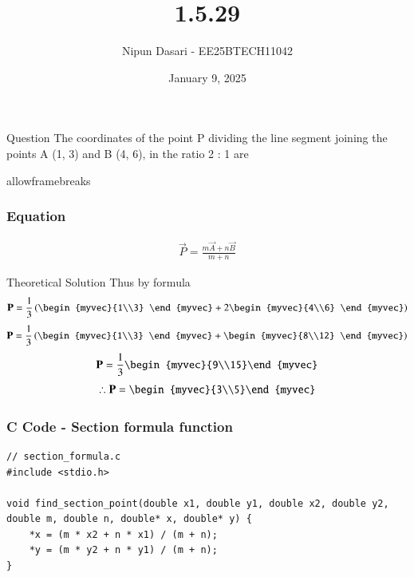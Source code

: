 \documentclass{beamer}
\title %
{1.5.29}
\date{January 9, 2025}
\author %
{Nipun Dasari - EE25BTECH11042}
\begin{document}
	
	
	\frame{\titlepage}
	\begin{frame}{Question}
		The coordinates of the point P dividing the line segment joining the points A (1, 3)
		and B (4, 6), in the ratio 2 : 1 are
	\end{frame}
	\begin{frame}{allowframebreaks}
		\frametitle{Equation}
		
		\centering
		
		\label{tab:parameters}
		\begin{align}
			\vec{P} = \frac{m\vec{A}+n\vec{B}}{m+n}
		\end{align}
		
	\end{frame}
	
	
	\begin{frame}{Theoretical Solution}
		Thus by formula
	\begin{align}
		\vec{P} = \frac{1}{3}\brak{\begin{myvec}{1\\3} \end{myvec}+2\begin{myvec}{4\\6} \end{myvec}}
	\end{align}
	\begin{align}
		\vec{P} = \frac{1}{3}\brak{\begin{myvec}{1\\3} \end{myvec}+\begin{myvec}{8\\12} \end{myvec}}
	\end{align}
	\begin{align}
		\vec{P} = \frac{1}{3}\begin{myvec}{9\\15}\end{myvec}
	\end{align}
	\begin{align}
		\therefore	\vec{P} = \begin{myvec}{3\\5}\end{myvec}
	\end{align}
	\end{frame}
	
	\begin{frame}[fragile]
		\frametitle{C Code - Section formula function }
		
		\begin{lstlisting}
// section_formula.c
#include <stdio.h>

void find_section_point(double x1, double y1, double x2, double y2, double m, double n, double* x, double* y) {
	*x = (m * x2 + n * x1) / (m + n);
	*y = (m * y2 + n * y1) / (m + n);
}
			\end{lstlisting}
		\end{frame}
\end{document}
